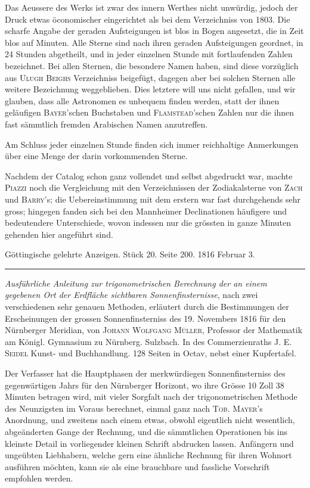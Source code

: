 Das Aeussere des Werks ist zwar des innern Werthes nicht unwürdig, jedoch der Druck etwas öconomischer eingerichtet als bei dem Verzeichniss von 1803. Die scharfe Angabe der geraden Aufsteigungen ist blos in Bogen angesetzt, die in Zeit blos auf Minuten. Alle Sterne sind nach ihren geraden Aufsteigungen geordnet, in 24 Stunden abgetheilt, und in jeder einzelnen Stunde mit fortlaufenden Zahlen bezeichnet. Bei allen Sternen, die besondere Namen haben, sind diese vorzüglich aus \textsc{Ulugh Beighs} Verzeichniss beigefügt, dagegen aber bei solchen Sternen alle weitere Bezeichnung weggeblieben. Dies letztere will uns nicht gefallen, und wir glauben, dass alle Astronomen es unbequem finden werden, statt der ihnen geläufigen \textsc{Bayer}'schen Buchstaben und \textsc{Flamstead}'schen Zahlen nur die ihnen fast sämmtlich fremden Arabischen Namen anzutreffen.

Am Schluss jeder einzelnen Stunde finden sich immer reichhaltige Anmerkungen über eine Menge der darin vorkommenden Sterne.

Nachdem der Catalog schon ganz vollendet und selbst abgedruckt war, machte \textsc{Piazzi} noch die Vergleichung mit den Verzeichnissen der Zodiakalsterne von \textsc{Zach} und \textsc{Barry}'s; die Uebereinstimmung mit dem erstern war fast durchgehends sehr gross; hingegen fanden sich bei den Mannheimer Declinationen häufigere und bedeutendere Unterschiede, wovon indessen nur die grössten in ganze Minuten gehenden hier angeführt sind.

\clearpage
{}
\hypertarget{native-596-lower}{}
\begin{center}\small Göttingische gelehrte Anzeigen. Stück 20. Seite 200. 1816 Februar 3.\\[3pt]\rule{.72\linewidth}{.3pt}\end{center}

\emph{Ausführliche Anleitung zur trigonometrischen Berechnung der an einem gegebenen Ort der Erdfläche sichtbaren Sonnenfinsternisse}, nach zwei verschiedenen sehr genauen Methoden, erläutert durch die Bestimmungen der Erscheinungen der grossen Sonnenfinsterniss des 19. Novembers 1816 für den Nürnberger Meridian, von \textsc{Johann Wolfgang Müller}, Professor der Mathematik am Königl. Gymnasium zu Nürnberg. Sulzbach. In des Commerzienraths J. E. \textsc{Seidel} Kunst- und Buchhandlung. 128 Seiten in Octav, nebst einer Kupfertafel.

Der Verfasser hat die Hauptphasen der merkwürdiegen Sonnenfinsterniss des gegenwärtigen Jahrs für den Nürnberger Horizont, wo ihre Grösse 10 Zoll 38 Minuten betragen wird, mit vieler Sorgfalt nach der trigonometrischen Methode des Neunzigsten im Voraus berechnet, einmal ganz nach \textsc{Tob. Mayer}'s Anordnung, und zweitens nach einem etwas, obwohl eigentlich nicht wesentlich, abgeänderten Gange der Rechnung, und die sämmtlichen Operationen bis ins kleinste Detail in vorliegender kleinen Schrift abdrucken lassen. Anfängern und ungeübten Liebhabern, welche gern eine ähnliche Rechnung für ihren Wohnort ausführen möchten, kann sie als eine brauchbare und fassliche Vorschrift empfohlen werden.
